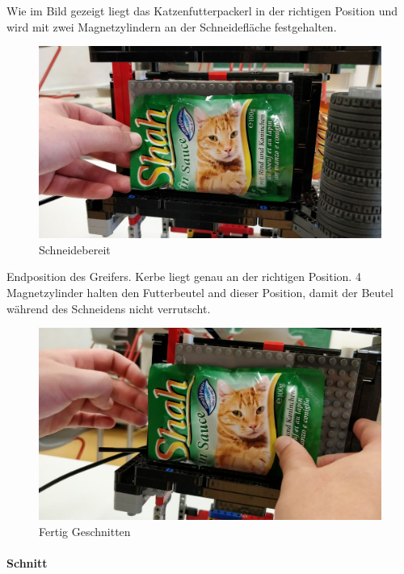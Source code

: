 \documentclass[a4paper,12pt]{scrartcl}
\begin{document}
Wie im Bild gezeigt liegt das Katzenfutterpackerl in der richtigen Position und wird mit zwei Magnetzylindern an der Schneidefläche festgehalten.

\begin{figure}[H]
\begin{center}
\includegraphics[width=13cm]{Bilder/Ablauf_1_png/Schneidebereit.jpeg}
\caption{Schneidebereit}
\end{center}
\end{figure}

Endposition des Greifers. Kerbe liegt genau an der richtigen Position. 4 Magnetzylinder halten den Futterbeutel and dieser Position, damit der Beutel während des Schneidens nicht verrutscht.

\begin{figure}[H]
\begin{center}
\includegraphics[width=13cm]{Bilder/Ablauf_1_png/Fertig_Geschnitten}
\caption{Fertig Geschnitten}
\end{center}
\end{figure}

\newpage
\paragraph{Schnitt}$~~$\\
\end{document}
